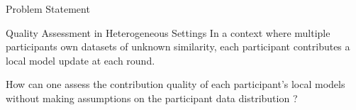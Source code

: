 \begin{frame}{Problem Statement}
  \begin{block}{Quality Assessment in Heterogeneous Settings}
    In a context where multiple participants own datasets of \alert{unknown similarity}, each participant contributes a local model update at each round. 
    
    How can one assess the \alert{contribution quality} of each participant’s local models without making assumptions on the \alert{participant data distribution} ?
  \end{block}
\end{frame}

